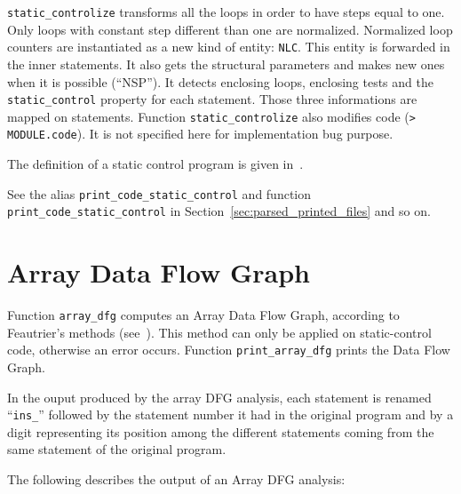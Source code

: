 \documentclass[a4paper]{report}
\newenvironment{PipsMake}{\begin{alltt}}{\end{alltt}}
\begin{document}
\verb+static_controlize+ transforms all the loops in order to have steps
equal to one. Only loops with constant step different than one are
normalized.  Normalized loop counters are instantiated as a new kind of
entity: \verb+NLC+.  This entity is forwarded in the inner
statements. It also gets the structural parameters and makes new ones
when it is possible (``NSP''). It detects enclosing loops, enclosing
tests and the \verb+static_control+ property for each statement. Those
three informations are mapped on statements. Function
\verb+static_controlize+ also modifies code (\verb+> MODULE.code+). It
is not specified here for implementation bug purpose.

The definition of a static control program is given in~\cite{Fea91}.


See the alias \verb|print_code_static_control| and function
\verb|print_code_static_control| in
Section~\ref{sec:parsed_printed_files} and so on.

\section{Array Data Flow Graph}
\label{subsection-array-data-flow-graph}

Function \verb+array_dfg+ computes an Array Data Flow Graph, according to
Feautrier's methods (see~\cite{Fea91}). This method can only be applied
on static-control code, otherwise an error occurs. Function
\verb+print_array_dfg+ prints the Data Flow Graph.

In the ouput produced by the array DFG analysis,
each statement is renamed ``\texttt{ins\_}'' followed by the statement number it had in the original
program and by a digit representing its position among the different
statements coming from the same statement of the original program.

The following describes the output of an Array DFG analysis:
\end{document}
